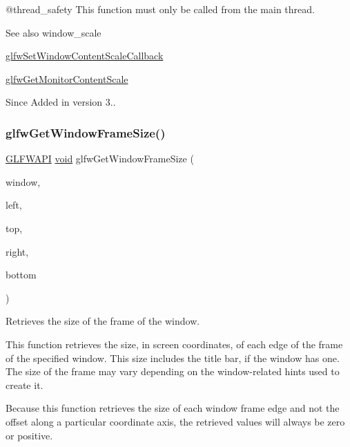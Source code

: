 @thread\+\_\+safety This function must only be called from the main thread.

\begin{DoxySeeAlso}{See also}
window\+\_\+scale 

\mbox{\hyperlink{group__window_ga51dd7f08ae0ad287b2fe97b2f835e186}{glfw\+Set\+Window\+Content\+Scale\+Callback}} 

\mbox{\hyperlink{group__monitor_ga28d856d94bea2ce8f09a67bb0346aaff}{glfw\+Get\+Monitor\+Content\+Scale}}
\end{DoxySeeAlso}
\begin{DoxySince}{Since}
Added in version 3.. 
\end{DoxySince}
\mbox{\label{group__window_gaad46cdaae2eb732f68d3a1499a7c5409}} 
\subsubsection{\texorpdfstring{glfwGetWindowFrameSize()}{glfwGetWindowFrameSize()}}
{\footnotesize\ttfamily \mbox{\hyperlink{glfw3_8h_a56da5036b2cc259351ae22fd6439bb47}{G\+L\+F\+W\+A\+PI}} \mbox{\hyperlink{glad_8h_a950fc91edb4504f62f1c577bf4727c29}{void}} glfw\+Get\+Window\+Frame\+Size (\begin{DoxyParamCaption}\item[{\mbox{\hyperlink{group__window_ga3c96d80d363e67d13a41b5d1821f3242}{G\+L\+F\+Wwindow}} $\ast$}]{window,  }\item[{int $\ast$}]{left,  }\item[{int $\ast$}]{top,  }\item[{int $\ast$}]{right,  }\item[{int $\ast$}]{bottom }\end{DoxyParamCaption})}



Retrieves the size of the frame of the window. 

This function retrieves the size, in screen coordinates, of each edge of the frame of the specified window. This size includes the title bar, if the window has one. The size of the frame may vary depending on the window-\/related hints used to create it.

Because this function retrieves the size of each window frame edge and not the offset along a particular coordinate axis, the retrieved values will always be zero or positive.


